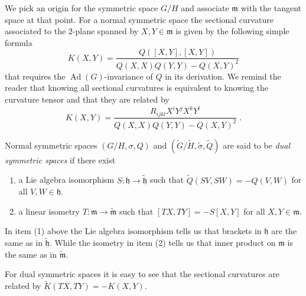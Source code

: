 \documentclass[a4paper,12pt]{article}
\DeclareMathOperator{\Ad}{Ad}
\newcommand{\lieh}{\mathfrak{h}}
\newcommand{\liem}{\mathfrak{m}}
\newcommand{\Gtil}{\widetilde{G}}
\newcommand{\Htil}{\widetilde{H}}
\newcommand{\Qtil}{\widetilde{Q}}
\newcommand{\sigtil}{\tilde{\sigma}}
\begin{document}
We pick an origin for the symmetric space $G/H$ and associate $\liem$
with the tangent space at that point.  For a normal symmetric space
the sectional curvature associated to the $2$-plane spanned by $X,Y
\in \liem$ is given by the following simple formula~\cite[p. 319]{ONeill:SRG}
\begin{equation}
    K(X,Y) = 
    \frac{Q([X,Y],[X,Y])}{Q(X,X)Q(Y,Y)-Q(X,Y)^{2}}
    \label{eq:sectional}
\end{equation}
that requires the $\Ad(G)$-invariance of $Q$ in its derivation.
We remind the reader that knowing all sectional curvatures is
equivalent to knowing the curvature tensor \cite{ONeill:SRG} and that
they are related by
$$
    K(X,Y) = 
    \frac{R_{ijkl}X^{i}Y^{j}X^{k}Y^{l}}{Q(X,X)Q(Y,Y)-Q(X,Y)^{2}}\;.
$$

Normal symmetric spaces $(G/H,\sigma,Q)$ and 
$(\Gtil/\Htil,\sigtil,\Qtil)$ are said to be \emph{dual 
symmetric spaces} if there exist
\begin{enumerate}
    \item a Lie algebra isomorphism $S:\lieh\to
    \tilde{\lieh}$ such that $\Qtil(S V,S W) = - Q(V,W)$ 
    for all $V,W \in \mathfrak{h}$.

    \item a linear isometry $T:\liem \to \widetilde{\liem}$ such that 
    $[TX,TY]=-S[X,Y]$ for all $X,Y \in \liem$.
\end{enumerate}
In item (1) above the Lie algebra isomorphism tells us that brackets
in $\lieh$ are the same as in $\tilde{\lieh}$.  While the isometry in
item (2) tells us that inner product on $\liem$ is the same as in
$\widetilde{\liem}$.

For dual symmetric spaces it is easy to see that the 
sectional curvatures are related by $\widetilde{K}(TX,TY) = -K(X,Y)$.
\end{document}
